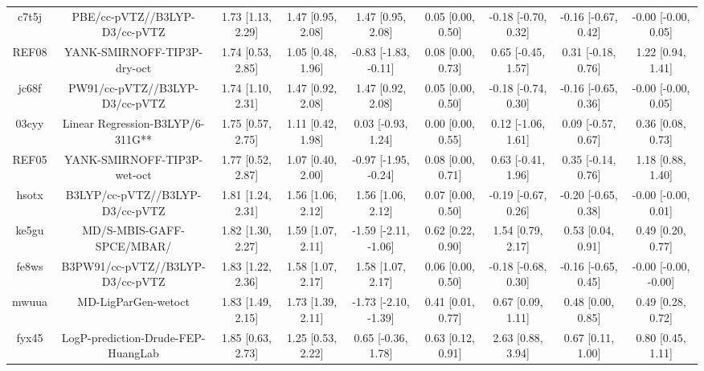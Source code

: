\documentclass{article}
\begin{document}
\begin{center}
\begin{longtable}{|ccccccccc|}
 c7t5j &                      PBE/cc-pVTZ//B3LYP-D3/cc-pVTZ &  1.73 [1.13, 2.29] &  1.47 [0.95, 2.08] &     1.47 [0.95, 2.08] &  0.05 [0.00, 0.50] &  -0.18 [-0.70, 0.32] &  -0.16 [-0.67, 0.42] &   -0.00 [-0.00, 0.05] \\
 REF08 &                        YANK-SMIRNOFF-TIP3P-dry-oct &  1.74 [0.53, 2.85] &  1.05 [0.48, 1.96] &  -0.83 [-1.83, -0.11] &  0.08 [0.00, 0.73] &   0.65 [-0.45, 1.57] &   0.31 [-0.18, 0.76] &     1.22 [0.94, 1.41] \\
 jc68f &                     PW91/cc-pVTZ//B3LYP-D3/cc-pVTZ &  1.74 [1.10, 2.31] &  1.47 [0.92, 2.08] &     1.47 [0.92, 2.08] &  0.05 [0.00, 0.50] &  -0.18 [-0.74, 0.30] &  -0.16 [-0.65, 0.36] &   -0.00 [-0.00, 0.05] \\
 03cyy &                   Linear Regression-B3LYP/6-311G** &  1.75 [0.57, 2.75] &  1.11 [0.42, 1.98] &    0.03 [-0.93, 1.24] &  0.00 [0.00, 0.55] &   0.12 [-1.06, 1.61] &   0.09 [-0.57, 0.67] &     0.36 [0.08, 0.73] \\
 REF05 &                        YANK-SMIRNOFF-TIP3P-wet-oct &  1.77 [0.52, 2.87] &  1.07 [0.40, 2.00] &  -0.97 [-1.95, -0.24] &  0.08 [0.00, 0.71] &   0.63 [-0.41, 1.96] &   0.35 [-0.14, 0.76] &     1.18 [0.88, 1.40] \\
 hsotx &                    B3LYP/cc-pVTZ//B3LYP-D3/cc-pVTZ &  1.81 [1.24, 2.31] &  1.56 [1.06, 2.12] &     1.56 [1.06, 2.12] &  0.07 [0.00, 0.50] &  -0.19 [-0.67, 0.26] &  -0.20 [-0.65, 0.38] &   -0.00 [-0.00, 0.01] \\
 ke5gu &                          MD/S-MBIS-GAFF-SPCE/MBAR/ &  1.82 [1.30, 2.27] &  1.59 [1.07, 2.11] &  -1.59 [-2.11, -1.06] &  0.62 [0.22, 0.90] &    1.54 [0.79, 2.17] &    0.53 [0.04, 0.91] &     0.49 [0.20, 0.77] \\
 fe8ws &                   B3PW91/cc-pVTZ//B3LYP-D3/cc-pVTZ &  1.83 [1.22, 2.36] &  1.58 [1.07, 2.17] &     1.58 [1.07, 2.17] &  0.06 [0.00, 0.50] &  -0.18 [-0.68, 0.30] &  -0.16 [-0.65, 0.45] &  -0.00 [-0.00, -0.00] \\
 mwuua &                                MD-LigParGen-wetoct &  1.83 [1.49, 2.15] &  1.73 [1.39, 2.11] &  -1.73 [-2.10, -1.39] &  0.41 [0.01, 0.77] &    0.67 [0.09, 1.11] &    0.48 [0.00, 0.85] &     0.49 [0.28, 0.72] \\
 fyx45 &                 LogP-prediction-Drude-FEP-HuangLab &  1.85 [0.63, 2.73] &  1.25 [0.53, 2.22] &    0.65 [-0.36, 1.78] &  0.63 [0.12, 0.91] &    2.63 [0.88, 3.94] &    0.67 [0.11, 1.00] &     0.80 [0.45, 1.11] \\

\end{longtable}
\end{center}
\end{document}
